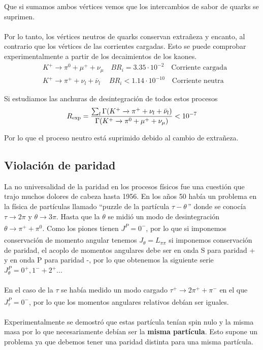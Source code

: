 \noindent Que si sumamos ambos vértices vemos que los intercambios de sabor de quarks se suprimen.\\\\
Por lo tanto, los vértices neutros de quarks conservan extrañeza y encanto, al contrario que los vértices de las corrientes cargadas.
Esto se puede comprobar experimentalmente a partir de los decaimientos de los kaones.
\begin{equation*}
    \begin{aligned}
        &K^+\longrightarrow \pi^0 +\mu^++\nu_\mu \quad BR_i=3.35 \cdot 10^{-2} \quad \text{Corriente cargada}\\
        &K^+\longrightarrow \pi^+ +\nu_l+\bar{\nu}_l \ \quad BR_i<1.14\cdot 10^{-10} \quad \text{Corriente neutra}
    \end{aligned}
\end{equation*}

\noindent Si estudiamos las anchuras de desintegración de todos estos procesos $$R_\mathrm{exp}=\frac{\sum_l \Gamma\qty(K^+\xrightarrow[]{} \pi^++\nu_l+\bar{\nu}_l)}{\Gamma\qty(K^+\xrightarrow[]{} \pi^0+\mu^++\nu_\mu )}<10^{-7}$$

Por lo que el proceso neutro está suprimido debido al cambio de extrañeza.
\subsection{Violación de paridad}
La no universalidad de la paridad en los procesos físicos fue una cuestión que trajo muchos dolores de cabeza hasta 1956. En los años 50 había un problema en la física de partículas llamado ``puzzle de la partícula $\tau-\theta\,$'' donde se conocía $\tau \xrightarrow[]{} 2\pi$ y $\theta \xrightarrow[]{} 3\pi$. Hasta que la $\theta$ se midió un modo de desintegración $\theta\xrightarrow[]{} \pi^++\pi^0$. Como los piones tienen $J^P=0^-$, por lo que si imponemos conservación de momento angular tenemos ${J}_\theta={L}_{\pi \pi}$ si imponemos conservación de paridad, el acoplo de momentos angulares debe ser en onda S para paridad + y en onda P para paridad -, por lo que obtenemos la siguiente serie 
$J^P_\theta=0^+,1^-+2^+...$ \\\\
En el caso de la $\tau$ se había medido un modo cargado $\tau^+\xrightarrow[]{} 2\pi^++ \pi^-$ en el que $J^P_\tau=0^-$, por lo que los momentos angulares relativos debían ser iguales.\\\\
Experimentalmente se demostró que estas partícula tenían spin nulo y la misma masa por lo que necesariamente debían ser la \textbf{misma partícula}. Esto supone un problema ya que debemos tener una paridad distinta para una misma partícula.
